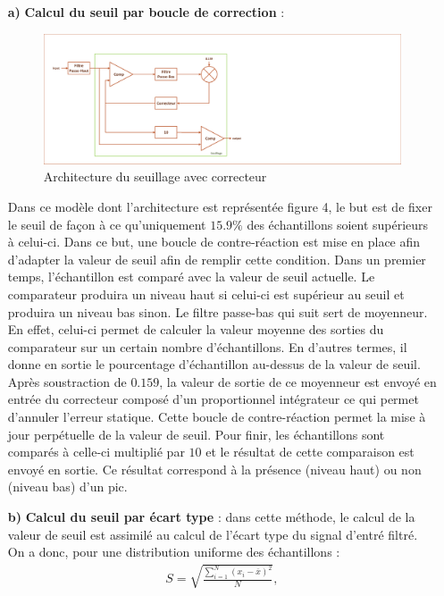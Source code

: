 \documentclass[a4paper,12pt]{article}
\begin{document}
\begin{itemize}
\begin{itemize}
\item[\textbf{a)}] \textbf{Calcul du seuil par boucle de correction} :
\begin{figure}[H]
\centering
\includegraphics[width=\textwidth, keepaspectratio]{chainCedric.pdf}
\caption{Architecture du seuillage avec correcteur}
\end{figure}
Dans ce modèle dont l'architecture est représentée figure 4, le but est de fixer le seuil de façon à ce qu'uniquement $15.9 \%$ des échantillons soient supérieurs à celui-ci. Dans ce but, une boucle de contre-réaction est mise en place afin d'adapter la valeur de seuil afin de remplir cette condition. Dans un premier temps, l'échantillon est comparé avec la valeur de seuil actuelle. Le comparateur produira un niveau haut si celui-ci est supérieur au seuil et produira un niveau bas sinon. Le filtre passe-bas qui suit sert de moyenneur. En effet, celui-ci permet de calculer la valeur moyenne des sorties du comparateur sur un certain nombre d'échantillons. En d'autres termes, il donne en sortie le pourcentage d'échantillon au-dessus de la valeur de seuil. Après soustraction de $0.159$, la valeur de sortie de ce moyenneur est envoyé en entrée du correcteur composé d'un proportionnel intégrateur ce qui permet d'annuler l'erreur statique. Cette boucle de contre-réaction permet la mise à jour perpétuelle de la valeur de seuil. Pour finir, les échantillons sont comparés à celle-ci multiplié par $10$ et le résultat de cette comparaison est envoyé en sortie. Ce résultat correspond à la présence (niveau haut) ou non (niveau bas) d'un pic.
\item[\textbf{b)}] \textbf{Calcul du seuil par écart type} : dans cette méthode, le calcul de la valeur de seuil est assimilé au calcul de l'écart type du signal d'entré filtré. On a donc, pour une distribution uniforme des échantillons :
\begin{eqnarray*}
S = \sqrt{\frac{\sum^N_{i=1}\left(x_i-\overline{x}\right)^2}{N}},
\end{eqnarray*}

\end{itemize}
\end{itemize}
\end{document}
